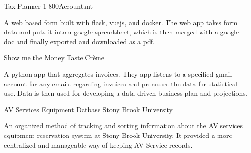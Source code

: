 


\begin{cventries}


\cventry
{Tax Planner} %
{1-800Accountant} %
{}
{}
{%
\begin{cvitems}
\item {A web based form built with flask, vuejs, and docker. The web app takes form data and puts it into a google spreadsheet, which is then merged with a google doc and finally exported and downloaded as a pdf.}
\end{cvitems}
}


\cventry
{Show me the Money} %
{Taste Crème} %
{}
{}
{%
\begin{cvitems}
\item {A python app that aggregates invoices. They app listens to a specified gmail account for any emails regarding invoices and processes the data for statistical use. Data is then used for developing a data driven business plan and projections.}
\end{cvitems}
}


\cventry
{AV Services Equipment Datbase} %
{Stony Brook University} %
{}
{}
{%
\begin{cvitems}
\item {An organized method of tracking and sorting information about the AV services equipment reservation system at Stony Brook University. It provided a more centralized and manageable way of keeping AV Service records.}
\end{cvitems}
}


\end{cventries}
